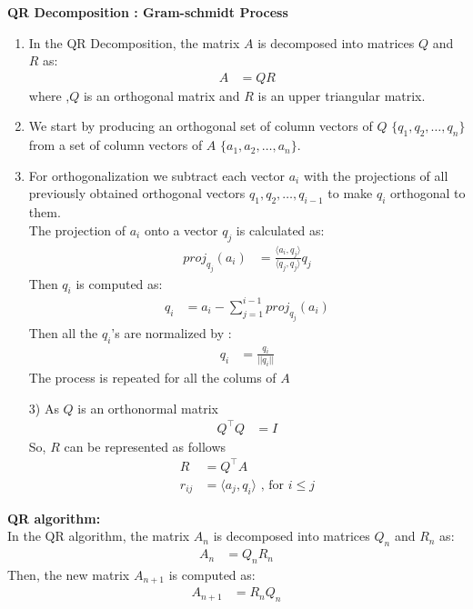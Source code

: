 \documentclass[journal]{IEEEtran}
\begin{document}
{\textbf{QR Decomposition : Gram-schmidt Process}
\begin{enumerate}
    \item  In the QR Decomposition, the matrix $A$ is decomposed into matrices $Q$ and $R$ as:
    \begin{align}
    A&=QR
    \end{align}
    where ,$Q$ is an orthogonal matrix and $R$ is an upper triangular matrix.
    \item We start by producing an orthogonal set of column vectors of $Q$ \( \{ q_1, q_2, \dots, q_n \} \) from a set of column vectors of $A$ \( \{ a_1, a_2, \dots, a_n \} \).
    \item For orthogonalization we subtract each vector $a_i$ with the projections of all previously obtained orthogonal vectors $q_1,q_2,\dots,q_{i-1}$ to make $q_i$ orthogonal to them. \\
    The projection of $a_i$ onto a vector $q_j$ is calculated as:
    \begin{align}
    proj_{q_j}(a_i) &= \frac{\langle a_i,q_j\rangle}{\langle q_j,q_j\rangle}q_j
    \end{align}
    Then $q_i$ is computed as:
    \begin{align}
    q_i &= a_i- \sum_{j=1}^{i-1}proj_{q_j}(a_i)
    \end{align}
    Then all the $q_i$'s are normalized by :
    \begin{align}
    q_i &= \frac{q_i}{||q_i||}
    \end{align}
    The process is repeated for all the colums of $A$
    \item[3)] As $Q$ is an orthonormal matrix
    \begin{align}
        Q^\top Q &=I
    \end{align}
    So, $R$ can be represented as follows
    \begin{align}
        R &= Q^\top A\\
        r_{ij} &= \langle a_j, q_i \rangle \text{ , for  }  i \leq j 
    \end{align}
\end{enumerate}
    \textbf{ QR algorithm:}\\
    In the  QR algorithm, the matrix $A_n$ is decomposed into matrices $Q_n$ and $R_n$ as:
    \begin{align}
    A_{n}&=Q_nR_n
    \end{align}
Then, the new matrix $A_{n+1}$ is computed as:
\begin{align}
A_{n+1}&=R_nQ_n

\end{align}}
\end{document}

